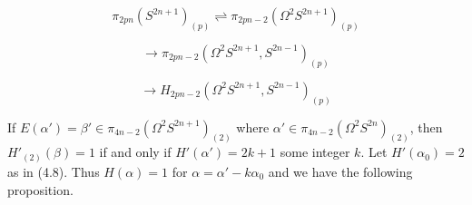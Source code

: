 $$\pi_{2pn} (S^{2n+1})_{(p)} \rightleftharpoons \pi_{2pn-2} (\Omega^2 S^{2n+1})_{(p)}$$

$$\rightarrow \pi_{2pn-2} (\Omega^2 S^{2n+1}, S^{2n-1})_{(p)}$$

$$\rightarrow H_{2pn-2} (\Omega^2 S^{2n+1}, S^{2n-1})_{(p)}$$

If $E(\alpha') = \beta' \in \pi_{4n-2}(\Omega^2 S^{2n+1})_{(2)}$ where $\alpha' \in \pi_{4n-2}(\Omega^2 S^{2n})_{(2)}$, then $H'_{(2)}(\beta) = 1$ if and only if $H'(\alpha') = 2k + 1$ some integer $k$. Let $H'(\alpha_0) = 2$ as in (4.8). Thus $H(\alpha) = 1$ for $\alpha = \alpha' - k\alpha_0$ and we have the following proposition.
